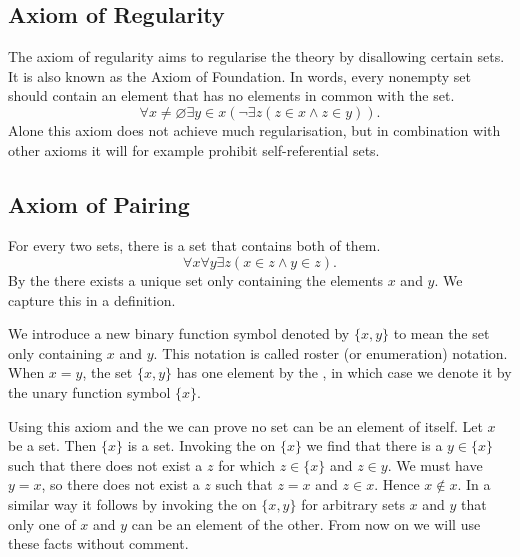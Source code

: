 \documentclass[../main.tex]{subfiles}
\begin{document}
\subsection*{Axiom of Regularity}\label{subsec:zermelo_fraenkel_set_theory:axiom_of_regularity}
The axiom of regularity aims to regularise the theory by disallowing certain sets. It is also known as the Axiom of Foundation. In words, every nonempty set should contain an element that has no elements in common with the set.
\begin{equation*}
    \forall x\neq\varnothing\exists y\in x(\lnot\exists z(z\in x\land z\in y)).
\end{equation*}
Alone this axiom does not achieve much regularisation, but in combination with other axioms it will for example prohibit self-referential sets. 

\subsection*{Axiom of Pairing}\label{subsec:zermelo_fraenkel_set_theory:axiom_of_pairing}
For every two sets, there is a set that contains both of them.
\begin{equation*}
    \forall x\forall y\exists z(x\in z\land y\in z).
\end{equation*}
By the  there exists a unique set only containing the elements $x$ and $y$. We capture this in a definition.
\begin{definition}\label{dfn:zermelo_fraenkel_set_theory:two_element_roster_notation}
    We introduce a new binary function symbol denoted by $\{x,y\}$ to mean the set only containing $x$ and $y$. This notation is called roster (or enumeration) notation. When $x=y$, the set $\{x,y\}$ has one element by the , in which case we denote it by the unary function symbol $\{x\}$.
\end{definition}
Using this axiom and the  we can prove no set can be an element of itself. Let $x$ be a set. Then $\{x\}$ is a set. Invoking the  on $\{x\}$ we find that there is a $y\in\{x\}$ such that there does not exist a $z$ for which $z\in\{x\}$ and $z\in y$. We must have $y=x$, so there does not exist a $z$ such that $z=x$ and $z\in x$. Hence $x\notin x$. In a similar way it follows by invoking the  on $\{x,y\}$ for arbitrary sets $x$ and $y$ that only one of $x$ and $y$ can be an element of the other. From now on we will use these facts without comment.
\end{document}
